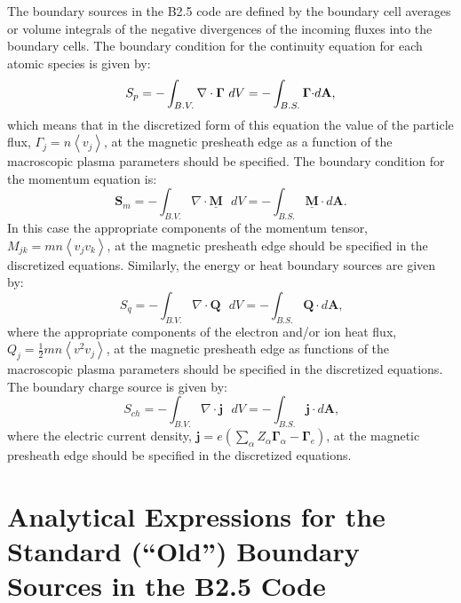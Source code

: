\documentclass[11pt]{article}
\begin{document}
The boundary sources in the B2.5 code are defined by the boundary cell
averages or volume integrals of the negative divergences of the incoming
fluxes into the boundary cells. The boundary condition for the continuity
equation for each atomic species is given by: 
\begin{equation}
S_{p}=-\int_{B.V.}\nabla\cdot\mathbf{\Gamma}\text{ }dV=-\int_{B.S.}\mathbf{%
\Gamma\cdot} d\mathbf{A}\text{,}   \label{1}
\end{equation}
which means that in the discretized form of this equation the value of the
particle flux, $\Gamma_{j}=n\left\langle v_{j}\right\rangle $, at the
magnetic presheath edge as a function of the macroscopic plasma parameters
should be specified. The boundary condition for the momentum equation is: 
\begin{equation}
\mathbf{S}_{m}=-\int_{B.V.}\nabla\cdot\underline{\mathbf{M}}\text{ }%
dV=-\int_{B.S.}\underline{\mathbf{M}}\cdot d\mathbf{A}\text{.}   \label{2}
\end{equation}
In this case the appropriate components of the momentum tensor, $%
M_{jk}=mn\left\langle v_{j}v_{k}\right\rangle $, at the magnetic presheath
edge should be specified in the discretized equations. Similarly, the energy
or heat boundary sources are given by: 
\begin{equation}
S_{q}=-\int_{B.V.}\nabla\cdot\mathbf{Q}\text{ }dV=-\int_{B.S.}\mathbf{Q\cdot}%
d\mathbf{A}\text{,}   \label{3}
\end{equation}
where the appropriate components of the electron and/or ion heat flux, $%
Q_{j}=\frac{1}{2}mn\left\langle v^{2}v_{j}\right\rangle $, at the magnetic
presheath edge as functions of the macroscopic plasma parameters should be
specified in the discretized equations. The boundary charge source is given
by: 
\begin{equation}
S_{ch}=-\int_{B.V.}\nabla\cdot\mathbf{j}\text{ }dV=-\int_{B.S.}\mathbf{j\cdot%
}d\mathbf{A}\text{,}   \label{4}
\end{equation}
where the electric current density, $\mathbf{j}=e\left( \sum_{\alpha
}Z_{\alpha}\mathbf{\Gamma}_{\alpha}-\mathbf{\Gamma}_{e}\right) $, at the
magnetic presheath edge should be specified in the discretized equations.

\bigskip

\section{Analytical Expressions for the Standard (``Old'') Boundary Sources
in the B2.5 Code}
\end{document}
